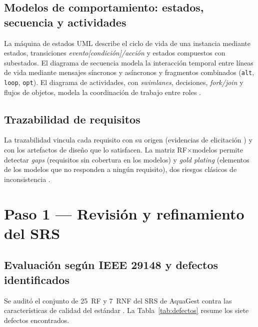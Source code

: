 \documentclass[11pt,a4paper]{article}
\renewcommand{\_}{\textunderscore\allowbreak}
\begin{document}
\subsection{Modelos de comportamiento: estados, secuencia y actividades}
La máquina de estados UML describe el ciclo de vida de una instancia mediante estados, transiciones \textit{evento[condición]/acción} y estados compuestos con subestados. El diagrama de secuencia modela la interacción temporal entre líneas de vida mediante mensajes síncronos y asíncronos y fragmentos combinados (\texttt{alt}, \texttt{loop}, \texttt{opt}). El diagrama de actividades, con \textit{swimlanes}, decisiones, \textit{fork/join} y flujos de objetos, modela la coordinación de trabajo entre roles \cite{omg2017,swebok2024}.

\subsection{Trazabilidad de requisitos}
La trazabilidad vincula cada requisito con su origen (evidencias de elicitación \cite{horkoff2021,hatton2023}) y con los artefactos de diseño que lo satisfacen. La matriz RF$\times$modelos permite detectar \textit{gaps} (requisitos sin cobertura en los modelos) y \textit{gold plating} (elementos de los modelos que no responden a ningún requisito), dos riesgos clásicos de inconsistencia \cite{ieee29148,encinas2022}.

\section{Paso 1 --- Revisión y refinamiento del SRS}
\subsection{Evaluación según IEEE 29148 y defectos identificados}
Se auditó el conjunto de 25~RF y 7~RNF del SRS de AquaGest contra las características de calidad del estándar \cite{ieee29148}. La Tabla~\ref{tab:defectos} resume los siete defectos encontrados.

\renewcommand{\arraystretch}{1.2}
\end{document}
